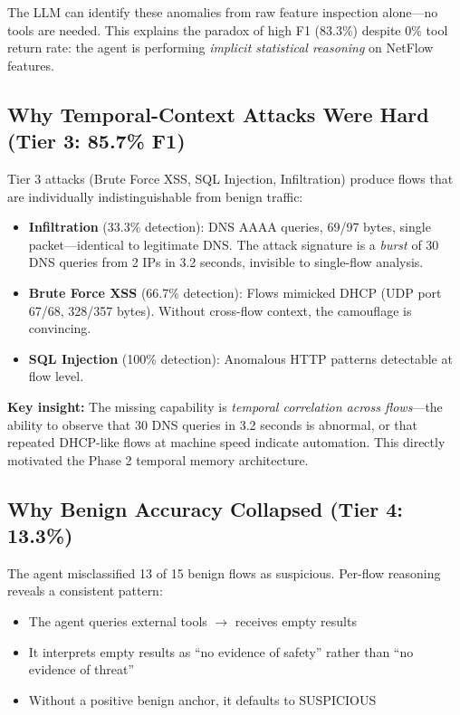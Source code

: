 \documentclass[12pt, a4paper, oneside]{report}
\begin{document}
The LLM can identify these anomalies from raw feature inspection alone---no tools
are needed. This explains the paradox of high F1 (83.3\%) despite 0\% tool
return rate: the agent is performing \emph{implicit statistical reasoning} on
NetFlow features.

\subsection{Why Temporal-Context Attacks Were Hard (Tier 3: 85.7\% F1)}

Tier 3 attacks (Brute Force XSS, SQL Injection, Infiltration) produce flows that
are individually indistinguishable from benign traffic:
\begin{itemize}
  \item \textbf{Infiltration} (33.3\% detection): DNS AAAA queries, 69/97 bytes,
        single packet---identical to legitimate DNS. The attack signature is a
        \emph{burst} of 30 DNS queries from 2 IPs in 3.2 seconds, invisible
        to single-flow analysis.
  \item \textbf{Brute Force XSS} (66.7\% detection): Flows mimicked DHCP
        (UDP port 67/68, 328/357 bytes). Without cross-flow context, the
        camouflage is convincing.
  \item \textbf{SQL Injection} (100\% detection): Anomalous HTTP patterns
        detectable at flow level.
\end{itemize}

\textbf{Key insight:} The missing capability is \emph{temporal correlation across
flows}---the ability to observe that 30 DNS queries in 3.2 seconds is abnormal,
or that repeated DHCP-like flows at machine speed indicate automation. This
directly motivated the Phase 2 temporal memory architecture.

\subsection{Why Benign Accuracy Collapsed (Tier 4: 13.3\%)}

The agent misclassified 13 of 15 benign flows as suspicious. Per-flow reasoning
reveals a consistent pattern:
\begin{itemize}
  \item The agent queries external tools $\rightarrow$ receives empty results
  \item It interprets empty results as ``no evidence of safety'' rather than
        ``no evidence of threat''
  \item Without a positive benign anchor, it defaults to SUSPICIOUS
\end{itemize}
\end{document}
